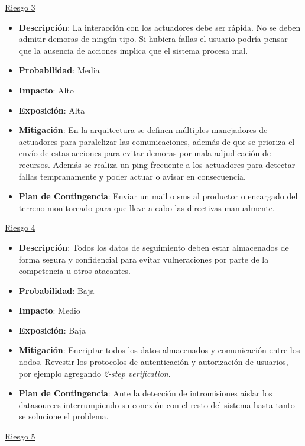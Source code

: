 \underline{Riesgo 3}
\begin{itemize} \itemsep -2pt
    \item \textbf{Descripción}: La interacción con los actuadores debe ser rápida. No se deben admitir demoras de ningún tipo. Si hubiera fallas el usuario podría pensar que la ausencia de acciones implica que el sistema procesa mal.
    \item \textbf{Probabilidad}: Media 
    \item \textbf{Impacto}: Alto
    \item \textbf{Exposición}: Alta
    \item \textbf{Mitigación}: En la arquitectura se definen múltiples manejadores de actuadores para paralelizar las comunicaciones, además de que se prioriza el envío de estas acciones para evitar demoras por mala adjudicación de recursos. Además se realiza un ping frecuente a los actuadores para detectar fallas tempranamente y poder actuar o avisar en consecuencia.
    \item \textbf{Plan de Contingencia}: Enviar un mail o sms al productor o encargado del terreno monitoreado para que lleve a cabo las directivas manualmente.
\end{itemize}

\underline{Riesgo 4}

\begin{itemize} \itemsep -2pt
    \item \textbf{Descripción}: Todos los datos de seguimiento deben estar almacenados de forma segura y confidencial para evitar vulneraciones por parte de la competencia u otros atacantes.
    \item \textbf{Probabilidad}: Baja
    \item \textbf{Impacto}: Medio
    \item \textbf{Exposición}: Baja
    \item \textbf{Mitigación}: Encriptar todos los datos almacenados y comunicación entre los nodos. Revestir los protocolos de autenticación y autorización de usuarios, por ejemplo agregando \textit{2-step verification}.
    \item \textbf{Plan de Contingencia}: Ante la detección de intromisiones aislar los datasources interrumpiendo su conexión con el resto del sistema hasta tanto se solucione el problema.
\end{itemize}

\underline{Riesgo 5}

